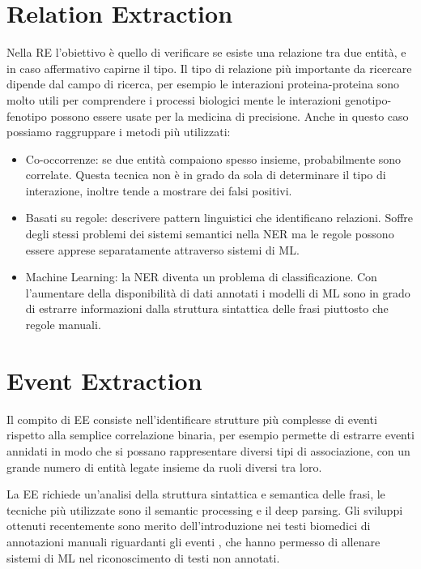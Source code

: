 \documentclass[12pt]{report}
\begin{document}
\section{Relation Extraction \label{re}}
Nella RE \cite{miningbook, recentadv} l'obiettivo è quello di verificare se esiste una relazione tra due entità, e in caso affermativo capirne il tipo. Il tipo di relazione più importante da ricercare dipende dal campo di ricerca, per esempio le interazioni proteina-proteina sono molto utili per comprendere i processi biologici mente le interazioni genotipo-fenotipo possono essere usate per la medicina di precisione. Anche in questo caso possiamo raggruppare i metodi più utilizzati:
\begin{itemize}
    \item Co-occorrenze: se due entità compaiono spesso insieme, probabilmente sono correlate. Questa tecnica non è in grado da sola di determinare il tipo di interazione, inoltre tende a mostrare dei falsi positivi.
    \item Basati su regole: descrivere pattern linguistici che identificano relazioni. Soffre degli stessi problemi dei sistemi semantici nella NER ma le regole possono essere apprese separatamente attraverso sistemi di ML.
    \item Machine Learning: la NER diventa un problema di classificazione. Con l'aumentare della disponibilità di dati annotati i modelli di ML sono in grado di estrarre informazioni dalla struttura sintattica delle frasi piuttosto che regole manuali.
\end{itemize}

\section{Event Extraction \label{ee}}
Il compito di EE consiste nell'identificare strutture più complesse di eventi rispetto alla semplice correlazione binaria, per esempio permette di estrarre eventi annidati in modo che si possano rappresentare diversi tipi di associazione, con un grande numero di entità legate insieme da ruoli diversi tra loro.

La EE richiede un'analisi della struttura sintattica e semantica delle frasi, le tecniche più utilizzate sono il semantic processing e il deep parsing. Gli sviluppi ottenuti recentemente sono merito dell'introduzione nei testi biomedici di annotazioni manuali riguardanti gli eventi \cite{ee_annotation}, che hanno permesso di allenare sistemi di ML nel riconoscimento di testi non annotati.
\end{document}
